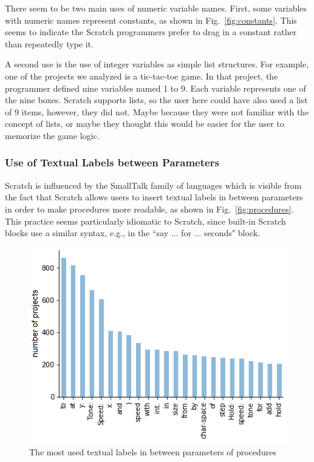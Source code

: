\documentclass[conference]{IEEEtran}
\begin{document}
There seem to be two main uses of numeric variable names. First, some variables with numeric names represent constants, as shown in Fig.~\ref{fig:constants}. This seems to indicate the Scratch programmers prefer to drag in a constant rather than repeatedly type it.

A second use is the use of integer variables as simple list structures. For example, one of the projects we analyzed is a tic-tac-toe game. In that project, the programmer defined nine variables named 1 to 9. Each variable represents one of the nine boxes. Scratch supports lists, so the user here could have also used a list of 9 items, however, they did not. Maybe because they were not familiar with the concept of lists, or maybe they thought this would be easier for the user to memorize the game logic.  

\subsubsection{Use of Textual Labels between Parameters}
Scratch is influenced by the SmallTalk family of languages which is visible from the fact that Scratch allows users to insert textual labels in between parameters in order to make procedures more readable, as shown in Fig.~\ref{fig:procedures}.
This practice seems particularly idiomatic to Scratch, since built-in Scratch blocks use a similar syntax, e.g., in the ``say ... for ... seconds" block. 
\begin{figure}
	\begin{center}
		\includegraphics[width=\columnwidth]{fig/project/labels_in_procedures}
		\caption{The most used textual labels in between parameters of procedures}
		\label{fig:labels}
	\end{center}
\end{figure} 
\end{document}
